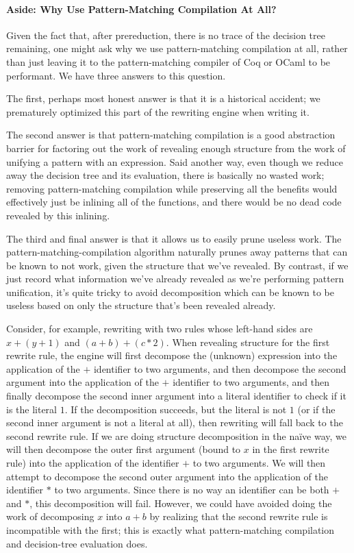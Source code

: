 \paragraph{Aside: Why Use Pattern-Matching Compilation At All?}
Given the fact that, after prereduction, there is no trace of the decision tree remaining, one might ask why we use pattern-matching compilation at all, rather than just leaving it to the pattern-matching compiler of Coq or OCaml to be performant.
We have three answers to this question.

The first, perhaps most honest answer is that it is a historical accident; we prematurely optimized this part of the rewriting engine when writing it.

The second answer is that pattern-matching compilation is a good abstraction barrier for factoring out the work of revealing enough structure from the work of unifying a pattern with an expression.
Said another way, even though we reduce away the decision tree and its evaluation, there is basically no wasted work; removing pattern-matching compilation while preserving all the benefits would effectively just be inlining all of the functions, and there would be no dead code revealed by this inlining.

The third and final answer is that it allows us to easily prune useless work.
The pattern-matching-compilation algorithm naturally prunes away patterns that can be known to not work, given the structure that we've revealed.
By contrast, if we just record what information we've already revealed as we're performing pattern unification, it's quite tricky to avoid decomposition which can be known to be useless based on only the structure that's been revealed already.

Consider, for example, rewriting with two rules whose left-hand sides are $x + (y + 1)$ and $(a + b) + (c * 2)$.
When revealing structure for the first rewrite rule, the engine will first decompose the (unknown) expression into the application of the $+$ identifier to two arguments, and then decompose the second argument into the application of the $+$ identifier to two arguments, and then finally decompose the second inner argument into a literal identifier to check if it is the literal $1$.
If the decomposition succeeds, but the literal is not $1$ (or if the second inner argument is not a literal at all), then rewriting will fall back to the second rewrite rule.
If we are doing structure decomposition in the naïve way, we will then decompose the outer first argument (bound to $x$ in the first rewrite rule) into the application of the identifier $+$ to two arguments.
We will then attempt to decompose the second outer argument into the application of the identifier $*$ to two arguments.
Since there is no way an identifier can be both $+$ and $*$, this decomposition will fail.
However, we could have avoided doing the work of decomposing $x$ into $a + b$ by realizing that the second rewrite rule is incompatible with the first; this is exactly what pattern-matching compilation and decision-tree evaluation does.

